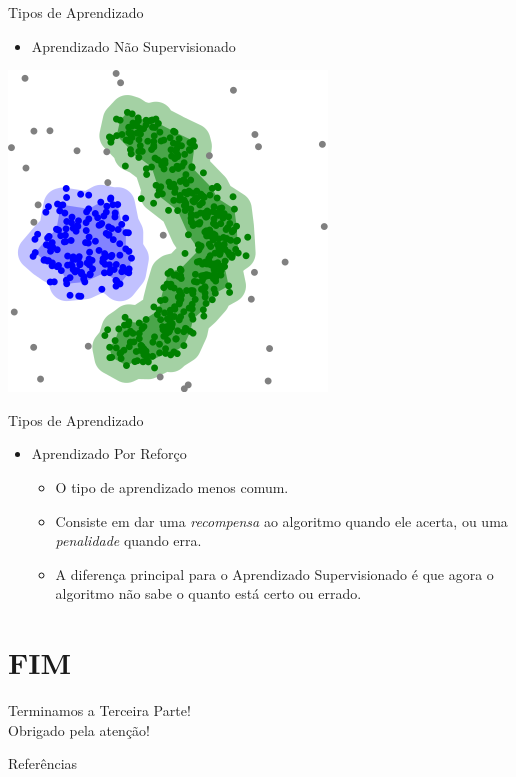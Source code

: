 \documentclass{libs/ufc_format}
\begin{document}
\begin{frame}{Tipos de Aprendizado}
    \begin{itemize}
        \item Aprendizado Não Supervisionado
    \end{itemize}
    \centering
    \includegraphics[scale=0.45]{media/dbscan_density_data}
\end{frame}

\begin{frame}{Tipos de Aprendizado}
    \begin{itemize}
        \item Aprendizado Por Reforço
            \begin{itemize}
                \justifying
                \item O tipo de aprendizado menos comum.
                \item<2-> Consiste em dar uma \textit{recompensa} ao algoritmo quando ele acerta, ou uma \textit{penalidade} quando erra.
                \item<3-> A diferença principal para o Aprendizado Supervisionado é que agora o algoritmo não sabe o quanto está certo ou errado.
            \end{itemize}
    \end{itemize}
\end{frame}
\section{FIM}

\begin{frame}{}
    \centering
    \Large
    Terminamos a Terceira Parte!\\
    Obrigado pela atenção!
\end{frame}

\begin{frame}[allowframebreaks]{Referências}
    \scriptsize
    \printbibliography
\end{frame}
\end{document}

